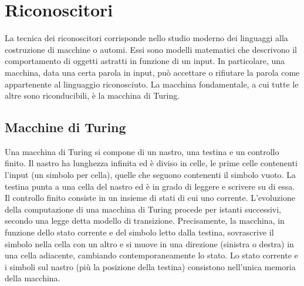 \section{Riconoscitori}
La tecnica dei riconoscitori corrisponde nello studio moderno dei linguaggi alla costruzione di macchine o automi. Essi sono modelli matematici che descrivono il comportamento di oggetti astratti in funzione di un input. In particolare, una macchina, data una certa parola in input, può accettare o rifiutare la parola come appartenente al linguaggio riconosciuto. La macchina fondamentale, a cui tutte le altre sono riconducibili, è la macchina di Turing.


\subsection{Macchine di Turing}
Una macchina di Turing si compone di un nastro, una testina e un controllo finito. Il nastro ha lunghezza infinita ed è diviso in celle, le prime celle contenenti l'input (un simbolo per cella), quelle che seguono contenenti il simbolo vuoto. La testina punta a una cella del nastro ed è in grado di leggere e scrivere su di essa. Il controllo finito consiste in un insieme di stati di cui uno corrente. L'evoluzione della computazione di una macchina di Turing procede per istanti successivi, secondo una legge detta modello di transizione. Precisamente, la macchina, in funzione dello stato corrente e del simbolo letto dalla testina, sovrascrive il simbolo nella cella con un altro e si muove in una direzione (sinistra o destra) in una cella adiacente, cambiando contemporaneamente lo stato. Lo stato corrente e i simboli sul nastro (più la posizione della testina) consistono nell'unica memoria della macchina.

